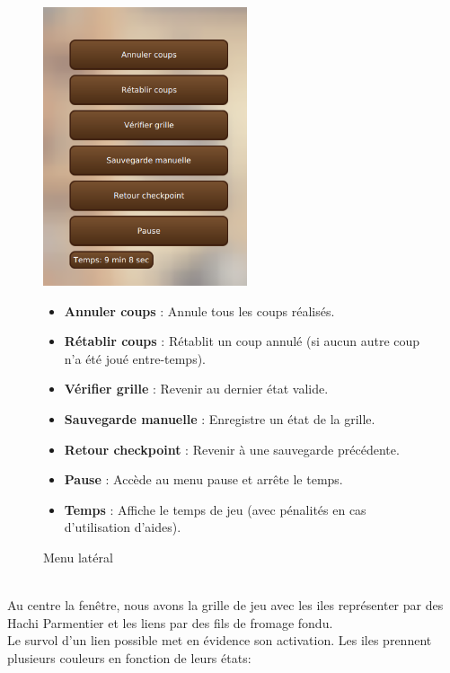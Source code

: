 \begin{figure}[h]
    \centering
    \begin{minipage}{0.4\textwidth}
        \includegraphics[width=6cm]{../Annexe/Screen/MenuD.png}
        \caption{Menu latéral}
    \end{minipage}%
    \hfill
    \begin{minipage}{0.55\textwidth}
        \begin{itemize}
            \item \textbf{Annuler coups} : Annule tous les coups réalisés.
            \item \textbf{Rétablir coups} : Rétablit un coup annulé (si aucun autre coup n'a été joué entre-temps).
            \item \textbf{Vérifier grille} : Revenir au dernier état valide.
            \item \textbf{Sauvegarde manuelle} : Enregistre un état de la grille.
            \item \textbf{Retour checkpoint} : Revenir à une sauvegarde précédente.
            \item \textbf{Pause} : Accède au menu pause et arrête le temps.
            \item \textbf{Temps} : Affiche le temps de jeu (avec pénalités en cas d'utilisation d'aides).
        \end{itemize}
    \end{minipage}
\end{figure}
\\
\pagebreak
Au centre la fenêtre, nous avons la grille de jeu avec les iles représenter par des Hachi Parmentier et les liens par des fils de fromage fondu.\\
Le survol d'un lien possible met en évidence son activation. Les iles prennent plusieurs couleurs en fonction de leurs états:
